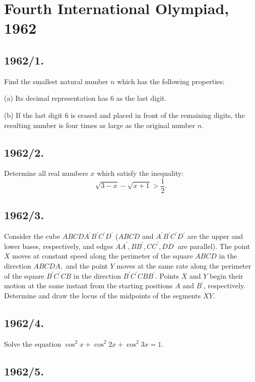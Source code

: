 \documentclass[12pt,thmsa]{article}
\begin{document}
\section{Fourth International Olympiad, 1962}

\subsection{1962/1.}

Find the smallest natural number $n$ which has the following properties:

(a) Its decimal representation has $6$ as the last digit. 

(b) If the last digit $6$ is erased and placed in front of the remaining
digits, the resulting number is four times as large as the original number $%
n.$

\subsection{1962/2.}

Determine all real numbers $x$ which satisfy the inequality:
\[
\sqrt{3-x}-\sqrt{x+1}>\frac{1}{2}.
\]

\subsection{1962/3.}

Consider the cube $ABCDA^{\prime }B^{\prime }C^{\prime }D^{\prime }$ ($ABCD$
and $A^{\prime }B^{\prime }C^{\prime }D^{\prime }$ are the upper and lower
bases, respectively, and edges $AA^{\prime },BB^{\prime },CC^{\prime
},DD^{\prime }$ are parallel). The point $X$ moves at constant speed along
the perimeter of the square $ABCD$ in the direction $ABCDA,$ and the point $Y
$ moves at the same rate along the perimeter of the square $B^{\prime
}C^{\prime }CB$ in the direction $B^{\prime }C^{\prime }CBB^{\prime }$.
Points $X$ and $Y$ begin their motion at the same instant from the starting
positions $A$ and $B^{\prime }$, respectively. Determine and draw the locus
of the midpoints of the segments $XY.$

\subsection{1962/4.}

Solve the equation $\cos ^{2}x+\cos ^{2}2x+\cos ^{2}3x=1.$

\subsection{1962/5.}
\end{document}
